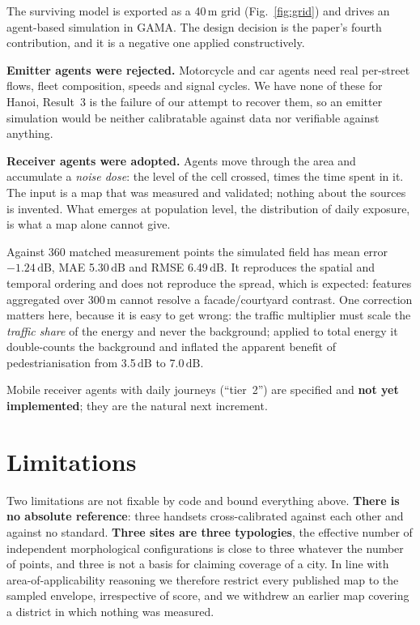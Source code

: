 \documentclass[10pt,twocolumn,a4paper]{article}
\newcommand{\dB}{\ensuremath{\,\mathrm{dB}}}
\begin{document}
The surviving model is exported as a 40\,m grid (Fig.~\ref{fig:grid}) and drives
an agent-based simulation in GAMA. The design decision is the paper's fourth
contribution, and it is a negative one applied constructively.

\textbf{Emitter agents were rejected.} Motorcycle and car agents need real
per-street flows, fleet composition, speeds and signal cycles. We have none of
these for Hanoi, Result~3 is the failure of our attempt to recover them, so an emitter simulation would be neither calibratable against data nor
verifiable against anything.

\textbf{Receiver agents were adopted.} Agents move through the area and
accumulate a \emph{noise dose}: the level of the cell crossed, times the time
spent in it. The input is a map that was measured and validated; nothing about
the sources is invented. What emerges at population level, the distribution of
daily exposure, is what a map alone cannot give.

Against 360 matched measurement points the simulated field has mean error
$-1.24$\dB, MAE 5.30\dB{} and RMSE 6.49\dB. It reproduces the spatial and
temporal ordering and does not reproduce the spread, which is expected: features
aggregated over 300\,m cannot resolve a facade/courtyard contrast. One correction matters here, because it is easy to get wrong: the traffic multiplier
must scale the \emph{traffic share} of the energy and never the background;
applied to total energy it double-counts the background and inflated the apparent
benefit of pedestrianisation from 3.5\dB{} to 7.0\dB.

Mobile receiver agents with daily journeys (``tier~2'') are specified and
\textbf{not yet implemented}; they are the natural next increment.

\section{Limitations}

Two limitations are not fixable by code and bound everything above. \textbf{There
is no absolute reference}: three handsets cross-calibrated against each other and
against no standard. \textbf{Three sites are three typologies}, the effective
number of independent morphological configurations is close to three whatever the
number of points, and three is not a basis for claiming coverage of a city. In
line with area-of-applicability reasoning \citep{meyer2021aoa} we therefore
restrict every published map to the sampled envelope, irrespective of score, and
we withdrew an earlier map covering a district in which nothing was measured.
\end{document}
